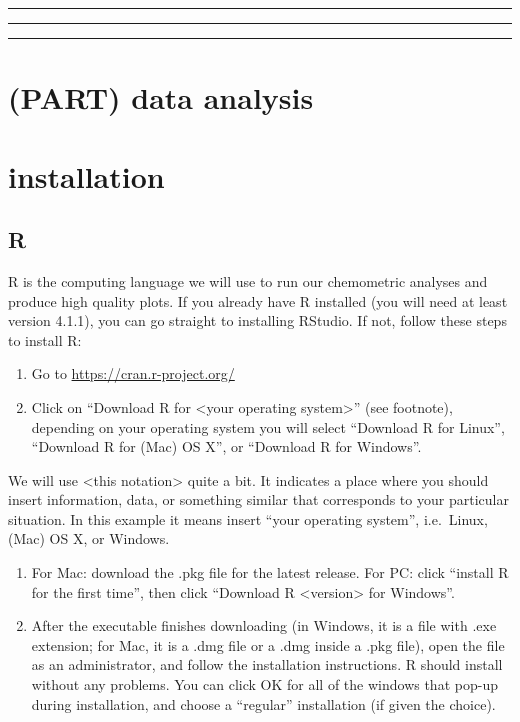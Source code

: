 \documentclass[
]{krantz}
\begin{document}
\begin{center}\rule{0.5\linewidth}{0.5pt}\end{center}

\begin{center}\rule{0.5\linewidth}{0.5pt}\end{center}

\begin{center}\rule{0.5\linewidth}{0.5pt}\end{center}

\hypertarget{part-data-analysis}{%
\section{(PART) data analysis}\label{part-data-analysis}}

\hypertarget{installation}{%
\section{installation}\label{installation}}

\hypertarget{r}{%
\subsection{R}\label{r}}

R is the computing language we will use to run our chemometric analyses and produce high quality plots. If you already have R installed (you will need at least version 4.1.1), you can go straight to installing RStudio. If not, follow these steps to install R:

\begin{enumerate}
\def\labelenumi{\arabic{enumi}.}
\item
  Go to \url{https://cran.r-project.org/}
\item
  Click on ``Download R for \textless your operating system\textgreater{}'' (see footnote), depending on your operating system you will select ``Download R for Linux'', ``Download R for (Mac) OS X'', or ``Download R for Windows''.
\end{enumerate}

We will use \textless this notation\textgreater{} quite a bit. It indicates a place where you should insert information, data, or something similar that corresponds to your particular situation. In this example it means insert ``your operating system'', i.e.~Linux, (Mac) OS X, or Windows.

\begin{enumerate}
\def\labelenumi{\arabic{enumi}.}
\setcounter{enumi}{2}
\item
  For Mac: download the .pkg file for the latest release. For PC: click ``install R for the first time'', then click ``Download R \textless version\textgreater{} for Windows''.
\item
  After the executable finishes downloading (in Windows, it is a file with .exe extension; for Mac, it is a .dmg file or a .dmg inside a .pkg file), open the file as an administrator, and follow the installation instructions. R should install without any problems. You can click OK for all of the windows that pop-up during installation, and choose a ``regular'' installation (if given the choice).
\end{enumerate}
\end{document}
